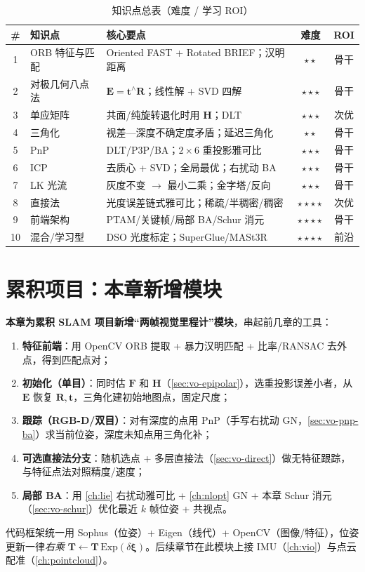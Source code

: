 \begin{table}[H]\centering\small
\caption{知识点总表（难度 / 学习 ROI）}
\begin{tabular}{cllcc}
\toprule
\# & 知识点 & 核心要点 & 难度 & ROI \\
\midrule
1 & ORB 特征与匹配 & Oriented FAST + Rotated BRIEF；汉明距离 & $\star\star$ & 骨干 \\
2 & 对极几何八点法 & $\mathbf{E}=\mathbf{t}^\wedge\mathbf{R}$；线性解 + SVD 四解 & $\star\star\star$ & 骨干 \\
3 & 单应矩阵 & 共面/纯旋转退化时用 $\mathbf{H}$；DLT & $\star\star\star$ & 次优 \\
4 & 三角化 & 视差—深度不确定度矛盾；延迟三角化 & $\star\star$ & 骨干 \\
5 & PnP & DLT/P3P/BA；$2\times6$ 重投影雅可比 & $\star\star\star$ & 骨干 \\
6 & ICP & 去质心 + SVD；全局最优；右扰动 BA & $\star\star\star$ & 骨干 \\
7 & LK 光流 & 灰度不变 $\to$ 最小二乘；金字塔/反向 & $\star\star\star$ & 骨干 \\
8 & 直接法 & 光度误差链式雅可比；稀疏/半稠密/稠密 & $\star\star\star\star$ & 次优 \\
9 & 前端架构 & PTAM/关键帧/局部 BA/Schur 消元 & $\star\star\star\star$ & 骨干 \\
10 & 混合/学习型 & DSO 光度标定；SuperGlue/MASt3R & $\star\star\star\star$ & 前沿 \\
\bottomrule
\end{tabular}
\end{table}

\section*{累积项目：本章新增模块}
\textbf{本章为累积 SLAM 项目新增“两帧视觉里程计”模块}，串起前几章的工具：
\begin{enumerate}
  \item \textbf{特征前端}：用 OpenCV ORB 提取 + 暴力汉明匹配 + 比率/RANSAC 去外点，得到匹配点对；
  \item \textbf{初始化（单目）}：同时估 $\mathbf{F}$ 和 $\mathbf{H}$（\cref{sec:vo-epipolar}），选重投影误差小者，从 $\mathbf{E}$ 恢复 $\mathbf{R},\mathbf{t}$，三角化建初始地图点，固定尺度；
  \item \textbf{跟踪（RGB-D/双目）}：对有深度的点用 PnP（手写右扰动 GN，\cref{sec:vo-pnp-ba}）求当前位姿，深度未知点用三角化补；
  \item \textbf{可选直接法分支}：随机选点 + 多层直接法（\cref{sec:vo-direct}）做无特征跟踪，与特征点法对照精度/速度；
  \item \textbf{局部 BA}：用 \cref{ch:lie} 右扰动雅可比 + \cref{ch:nlopt} GN + 本章 Schur 消元（\cref{sec:vo-schur}）优化最近 $k$ 帧位姿 + 共视点。
\end{enumerate}
代码框架统一用 Sophus（位姿）+ Eigen（线代）+ OpenCV（图像/特征），位姿更新一律\emph{右乘} $\mathbf{T}\leftarrow\mathbf{T}\,\mathrm{Exp}(\delta\boldsymbol{\xi})$。后续章节在此模块上接 IMU（\cref{ch:vio}）与点云配准（\cref{ch:pointcloud}）。

